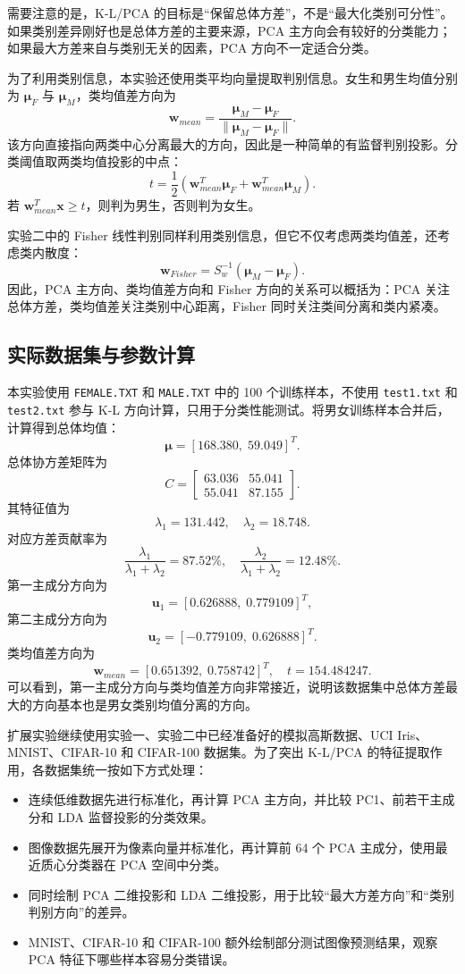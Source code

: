 \documentclass[UTF8,a4paper,12pt]{ctexart}
\begin{document}
需要注意的是，K-L/PCA 的目标是“保留总体方差”，不是“最大化类别可分性”。如果类别差异刚好也是总体方差的主要来源，PCA 主方向会有较好的分类能力；如果最大方差来自与类别无关的因素，PCA 方向不一定适合分类。

为了利用类别信息，本实验还使用类平均向量提取判别信息。女生和男生均值分别为 $\boldsymbol{\mu}_F$ 与 $\boldsymbol{\mu}_M$，类均值差方向为
\[
\boldsymbol{w}_{mean}=\frac{\boldsymbol{\mu}_M-\boldsymbol{\mu}_F}{\|\boldsymbol{\mu}_M-\boldsymbol{\mu}_F\|}.
\]
该方向直接指向两类中心分离最大的方向，因此是一种简单的有监督判别投影。分类阈值取两类均值投影的中点：
\[
t=\frac{1}{2}\left(\boldsymbol{w}_{mean}^T\boldsymbol{\mu}_F+\boldsymbol{w}_{mean}^T\boldsymbol{\mu}_M\right).
\]
若 $\boldsymbol{w}_{mean}^T\boldsymbol{x}\ge t$，则判为男生，否则判为女生。

实验二中的 Fisher 线性判别同样利用类别信息，但它不仅考虑两类均值差，还考虑类内散度：
\[
\boldsymbol{w}_{Fisher}=S_w^{-1}(\boldsymbol{\mu}_M-\boldsymbol{\mu}_F).
\]
因此，PCA 主方向、类均值差方向和 Fisher 方向的关系可以概括为：PCA 关注总体方差，类均值差关注类别中心距离，Fisher 同时关注类间分离和类内紧凑。

\subsection{实际数据集与参数计算}

本实验使用 \texttt{FEMALE.TXT} 和 \texttt{MALE.TXT} 中的 100 个训练样本，不使用 \texttt{test1.txt} 和 \texttt{test2.txt} 参与 K-L 方向计算，只用于分类性能测试。将男女训练样本合并后，计算得到总体均值：
\[
\boldsymbol{\mu}=[168.380,\;59.049]^T.
\]
总体协方差矩阵为
\[
C=
\begin{bmatrix}
63.036 & 55.041\\
55.041 & 87.155
\end{bmatrix}.
\]
其特征值为
\[
\lambda_1=131.442,
\quad
\lambda_2=18.748.
\]
对应方差贡献率为
\[
\frac{\lambda_1}{\lambda_1+\lambda_2}=87.52\%,
\quad
\frac{\lambda_2}{\lambda_1+\lambda_2}=12.48\%.
\]
第一主成分方向为
\[
\boldsymbol{u}_1=[0.626888,\;0.779109]^T,
\]
第二主成分方向为
\[
\boldsymbol{u}_2=[-0.779109,\;0.626888]^T.
\]
类均值差方向为
\[
\boldsymbol{w}_{mean}=[0.651392,\;0.758742]^T,
\quad
 t=154.484247.
\]
可以看到，第一主成分方向与类均值差方向非常接近，说明该数据集中总体方差最大的方向基本也是男女类别均值分离的方向。

扩展实验继续使用实验一、实验二中已经准备好的模拟高斯数据、UCI Iris、MNIST、CIFAR-10 和 CIFAR-100 数据集。为了突出 K-L/PCA 的特征提取作用，各数据集统一按如下方式处理：
\begin{itemize}
  \item 连续低维数据先进行标准化，再计算 PCA 主方向，并比较 PC1、前若干主成分和 LDA 监督投影的分类效果。
  \item 图像数据先展开为像素向量并标准化，再计算前 64 个 PCA 主成分，使用最近质心分类器在 PCA 空间中分类。
  \item 同时绘制 PCA 二维投影和 LDA 二维投影，用于比较“最大方差方向”和“类别判别方向”的差异。
  \item MNIST、CIFAR-10 和 CIFAR-100 额外绘制部分测试图像预测结果，观察 PCA 特征下哪些样本容易分类错误。
\end{itemize}
\end{document}
